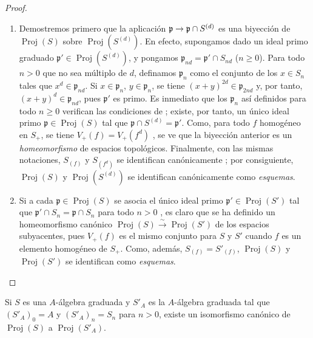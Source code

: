 \documentclass[oneside,10pt]{amsart}
\makeatletter
\renewcommand{\geq}{\geqslant}
\newcommand{\ega@arrow}[2]{\mathchoice{#1}{#2}{#2}{#2}}
\renewcommand{\to}{\ega@arrow{\longrightarrow}{\rightarrow}}
\let\EGAOriginalLabel\label
\renewcommand{\label}[1]{\phantomsection\EGAOriginalLabel{#1}}
\makeatother
\begin{document}
\begin{proof}
\medskip\noindent
\begin{enumerate}
  \item[\rm(i)] Demostremos primero que la aplicación $\mathfrak{p}\to\mathfrak{p}\cap S^{(d)}$ es una biyección de $\operatorname{Proj}(S)$ sobre $\operatorname{Proj}(S^{(d)})$.
  En efecto, supongamos dado un ideal primo graduado $\mathfrak{p}'\in\operatorname{Proj}(S^{(d)})$, y pongamos $\mathfrak{p}_{nd}=\mathfrak{p}'\cap S_{nd}$ ($n\geq0$).
  Para todo $n>0$ que no sea múltiplo de $d$, definamos $\mathfrak{p}_n$ como el conjunto de los $x\in S_n$ tales que $x^d\in\mathfrak{p}_{nd}$.
  Si $x\in\mathfrak{p}_n$, $y\in\mathfrak{p}_n$, se tiene $(x+y)^{2d}\in\mathfrak{p}_{2nd}$ y, por tanto, $(x+y)^d\in\mathfrak{p}_{nd}$, pues $\mathfrak{p}'$ es primo.
  Es inmediato que los $\mathfrak{p}_n$ así definidos para todo $n\geq0$ verifican las condiciones de ; existe, por tanto, un único ideal primo $\mathfrak{p}\in\operatorname{Proj}(S)$ tal que $\mathfrak{p}\cap S^{(d)}=\mathfrak{p}'$.
  Como, para todo $f$ homogéneo en $S_+$, se tiene $V_+(f)=V_+(f^d)$ , se ve que la biyección anterior es un \emph{homeomorfismo} de espacios topológicos.
  Finalmente, con las mismas notaciones, $S_{(f)}$ y $S_{(f^d)}$ se identifican canónicamente ; por consiguiente, $\operatorname{Proj}(S)$ y $\operatorname{Proj}(S^{(d)})$ se identifican canónicamente como \emph{esquemas}.
  \item[\rm(ii)] Si a cada $\mathfrak{p}\in\operatorname{Proj}(S)$ se asocia el único ideal primo $\mathfrak{p}'\in\operatorname{Proj}(S')$ tal que $\mathfrak{p}'\cap S_n=\mathfrak{p}\cap S_n$ para todo $n>0$ , es claro que se ha definido un homeomorfismo canónico $\operatorname{Proj}(S)\xrightarrow{\sim}\operatorname{Proj}(S')$ de los espacios subyacentes, pues $V_+(f)$ es el mismo conjunto para $S$ y $S'$ cuando $f$ es un elemento homogéneo de $S_+$.
  Como, además, $S_{(f)}=S'_{(f)}$, $\operatorname{Proj}(S)$ y $\operatorname{Proj}(S')$ se identifican como \emph{esquemas}.
\end{enumerate}
\end{proof}

\begin{corollary}[2.4.8]
\label{II.2.4.8-fr}
Si $S$ es una $A$-álgebra graduada y $S'_A$ es la $A$-álgebra graduada tal que $(S'_A)_0=A$ y $(S'_A)_n=S_n$ para $n>0$, existe un isomorfismo canónico de $\operatorname{Proj}(S)$ a $\operatorname{Proj}(S'_A)$.
\end{corollary}
\end{document}
